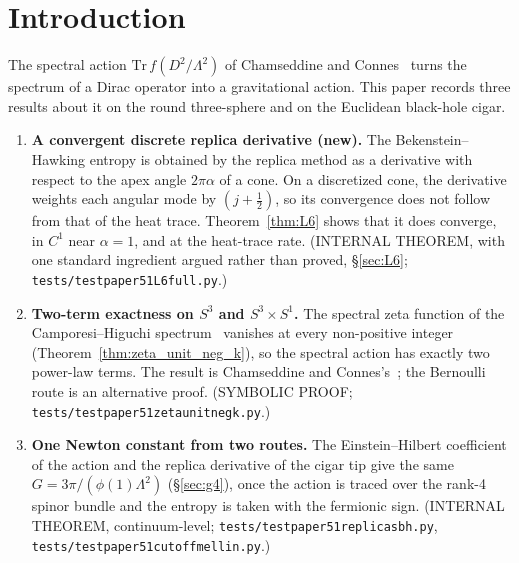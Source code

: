 \documentclass[11pt,a4paper]{article}
\theoremstyle{plain}
\theoremstyle{definition}
\newcommand{\sthree}{S^{3}}
\renewcommand{\_}{\textunderscore\allowbreak}
\begin{document}
\tableofcontents

\section{Introduction}

The spectral action $\mathrm{Tr}\, f(D^2/\Lambda^2)$ of
Chamseddine and Connes~\cite{chamseddine_connes1997, chamseddine_connes2010}
turns the spectrum of a Dirac operator into a gravitational action. This
paper records three results about it on the round three-sphere and on the
Euclidean black-hole cigar.

\begin{enumerate}
  \item \textbf{A convergent discrete replica derivative (new).} The
        Bekenstein--Hawking entropy is obtained by the replica method as
        a derivative with respect to the apex angle $2\pi\alpha$ of a
        cone. On a discretized cone, the derivative weights each angular
        mode by $(j+\tfrac12)$, so its convergence does not follow from
        that of the heat trace. Theorem~\ref{thm:L6} shows that it does
        converge, in $C^1$ near $\alpha = 1$, and at the heat-trace rate.
        (INTERNAL THEOREM, with one standard ingredient argued rather than
        proved, \S\ref{sec:L6};
        \texttt{tests/test\_paper51\_L6\_full.py}.)
  \item \textbf{Two-term exactness on $\sthree$ and $\sthree \times S^1$.}
        The spectral zeta function of the Camporesi--Higuchi
        spectrum~\cite{camporesi_higuchi1996} vanishes at every
        non-positive integer (Theorem~\ref{thm:zeta_unit_neg_k}), so the
        spectral action has exactly two power-law terms. The result is
        Chamseddine and Connes's~\cite{chamseddine_connes2008_uncanny};
        the Bernoulli route is an alternative proof. (SYMBOLIC PROOF;
        \texttt{tests/test\_paper51\_zeta\_unit\_neg\_k.py}.)
  \item \textbf{One Newton constant from two routes.} The
        Einstein--Hilbert coefficient of the action and the replica
        derivative of the cigar tip give the same
        $G = 3\pi/(\phi(1)\Lambda^2)$ (\S\ref{sec:g4}), once the action is
        traced over the rank-4 spinor bundle and the entropy is taken with
        the fermionic sign. (INTERNAL THEOREM, continuum-level;
        \texttt{tests/test\_paper51\_replica\_sbh.py},
        \texttt{tests/test\_paper51\_cutoff\_mellin.py}.)
\end{enumerate}
\end{document}
